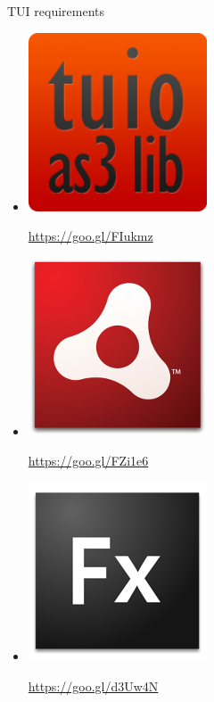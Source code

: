 \begin{frame}%
\begin{block}{TUI requirements}
\begin{minipage}{1.0\linewidth}
\begin{itemize}
\item[] \includegraphics[scale=0.16]{images/tuioAS3.png}$\;$
\begin{scriptsize}
\url{https://goo.gl/FIukmz}
\end{scriptsize}%
\item[] \includegraphics[scale=0.16]{images/Adobe-Air.jpg}$\;$
\begin{scriptsize}
\url{https://goo.gl/FZi1e6}
\end{scriptsize}
\item[] \includegraphics[scale=0.16]{images/Fx_small.png}$\;$
\begin{scriptsize}
\url{https://goo.gl/d3Uw4N}

\end{scriptsize}
\end{itemize}
\end{minipage}
\end{block}
\end{frame}
